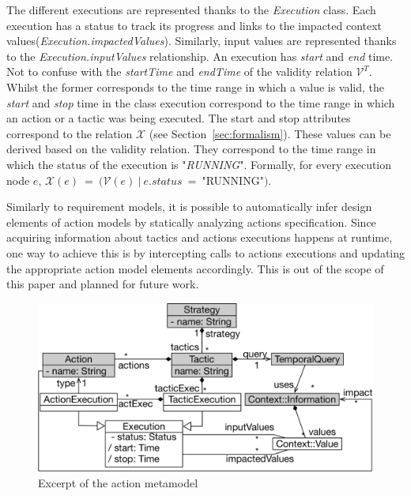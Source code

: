 The different executions are represented thanks to the \textit{Execution} class. Each execution has a status to track its progress and links to the impacted context values(\textit{Execution.impactedValues}).
Similarly, input values are represented thanks to the \textit{Execution.inputValues} relationship.
An execution has \textit{start} and \textit{end} time. Not to confuse with the \textit{startTime} and \textit{endTime} of the validity relation $\mathcal{V}^T$. Whilst the former corresponds to the time range in which a value is valid, the \textit{start} and \textit{stop} time in the class execution correspond to the time range in which an action or a tactic was being executed. The start and stop attributes correspond to the relation $\mathcal{X}$ (see Section~\ref{sec:formalism}). These values can be derived based on the validity relation. They correspond to the time range in which the status of the execution is "\textit{RUNNING}".  Formally, for every execution node $e$, $\mathcal{X}(e)~=~(\mathcal{V}(e)~|~e.status~=~$"RUNNING"$)$.


Similarly to requirement models, it is possible to automatically infer design elements of action models by statically analyzing actions specification.
Since acquiring information about tactics and actions executions happens at runtime, one way to achieve this is by intercepting calls to actions executions and updating the appropriate action model elements accordingly. This is out of the scope of this paper and planned for future work.

\begin{figure}
	\centering
	\includegraphics[width=0.8\linewidth]{img/chapt-tkm/mm/actionModel}
	\caption{Excerpt of the action metamodel}
	\label{fig:action-mm}
\end{figure}
 
 






